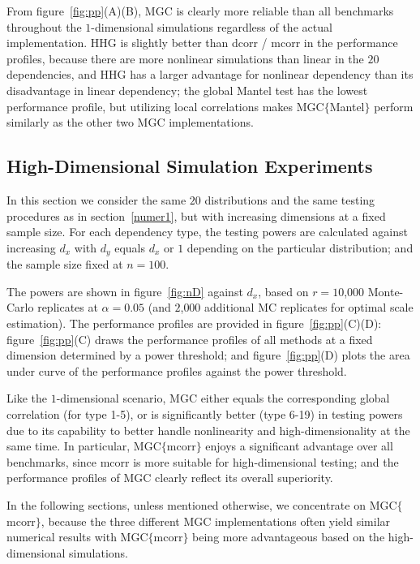 \documentclass[11pt]{article}
\begin{document}
From figure~\ref{fig:pp}(A)(B), MGC is clearly more reliable than all benchmarks throughout the $1$-dimensional simulations regardless of the actual implementation. HHG is slightly better than dcorr / mcorr in the performance profiles, because there are more nonlinear simulations than linear in the $20$ dependencies, and HHG has a larger advantage for nonlinear dependency than its disadvantage in linear dependency; the global Mantel test has the lowest performance profile, but utilizing local correlations makes MGC$\{$Mantel$\}$ perform similarly as the other two MGC implementations.

\subsection{High-Dimensional Simulation Experiments}
\label{numer2}
In this section we consider the same $20$ distributions and the same testing procedures as in section~\ref{numer1}, but with increasing dimensions at a fixed sample size. For each dependency type, the testing powers are calculated against increasing $d_{x}$ with $d_{y}$ equals $d_{x}$ or $1$ depending on the particular distribution; and the sample size fixed at $n=100$.

The powers are shown in figure~\ref{fig:nD} against $d_{x}$, based on $r=10$,$000$ Monte-Carlo replicates at $\alpha=0.05$ (and $2$,$000$ additional MC replicates for optimal scale estimation). The performance profiles are provided in figure~\ref{fig:pp}(C)(D): figure~\ref{fig:pp}(C) draws the performance profiles of all methods at a fixed dimension determined by a power threshold; and figure~\ref{fig:pp}(D) plots the area under curve of the performance profiles against the power threshold.

Like the $1$-dimensional scenario, MGC either equals the corresponding global correlation (for type 1-5), or is significantly better (type 6-19) in testing powers due to its capability to better handle nonlinearity and high-dimensionality at the same time. In particular, MGC$\{$mcorr$\}$ enjoys a significant advantage over all benchmarks, since mcorr is more suitable for high-dimensional testing; and the performance profiles of MGC clearly reflect its overall superiority. 

In the following sections, unless mentioned otherwise, we concentrate on MGC$\{$mcorr$\}$, because the three different MGC implementations often yield similar numerical results with MGC$\{$mcorr$\}$ being more advantageous based on the high-dimensional simulations.
\end{document}
